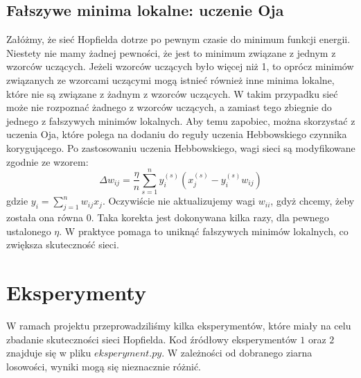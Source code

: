 \documentclass{article}
\begin{document}
\subsection{Fałszywe minima lokalne: uczenie Oja}
Załóżmy, że sieć Hopfielda dotrze po pewnym czasie do minimum funkcji energii.
Niestety nie mamy żadnej pewności, że jest to minimum związane z jednym z wzorców uczących.
Jeżeli wzorców uczących było więcej niż 1, to oprócz minimów związanych ze wzorcami uczącymi 
mogą istnieć również inne minima lokalne, które nie są związane z żadnym z wzorców uczących.
W takim przypadku sieć może nie rozpoznać żadnego z wzorców uczących, a zamiast tego zbiegnie do jednego z fałszywych minimów lokalnych.
Aby temu zapobiec, można skorzystać z uczenia Oja, które polega na dodaniu do reguły uczenia Hebbowskiego czynnika korygującego.
Po zastosowaniu uczenia Hebbowskiego, wagi sieci są modyfikowane zgodnie ze wzorem:
$$\Delta w_{ij} = \frac{\eta}{n} \sum_{s=1}^{n}y_i^{(s)}(x_j^{(s)} - y_i^{(s)}w_{ij})$$
gdzie $y_i = \sum_{j = 1}^{n} w_{ij}x_j$. Oczywiście nie aktualizujemy wagi $w_{ii}$,
gdyż chcemy, żeby została ona równa $0$.
Taka korekta jest dokonywana kilka razy, dla pewnego ustalonego $\eta$.
W praktyce pomaga to uniknąć fałszywych minimów lokalnych, co zwiększa skuteczność sieci.

\section{Eksperymenty}
W ramach projektu przeprowadziliśmy kilka eksperymentów, które miały na celu zbadanie skuteczności sieci Hopfielda.
Kod źródłowy eksperymentów $1$ oraz $2$ znajduje się w pliku $eksperyment.py$.
W zależności od dobranego ziarna losowości, wyniki mogą się nieznacznie różnić.
\end{document}
